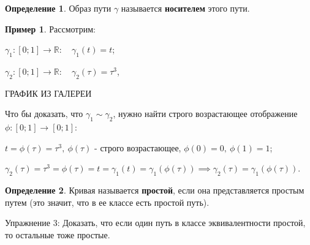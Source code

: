 \documentclass{report}
\theoremstyle{definition}
\newtheorem{definition}{Определение}[section]
\newtheorem{example}{Пример}
\begin{document}
\begin{definition}
  Образ пути $\gamma$ называется \textbf{носителем} этого пути.
\end{definition}

\begin{example}
  Рассмотрим:
  
  $\gamma_1: [0;1] \rightarrow \mathbb{R}: \quad \gamma_1(t) = t$;

  $\gamma_2: [0;1] \rightarrow \mathbb{R}: \quad \gamma_2(\tau) = \tau^3$,

  {\Large ГРАФИК ИЗ ГАЛЕРЕИ}

  Что бы доказать, что $\gamma_1 \sim \gamma_2$, нужно найти строго возрастающее отображение
  $\phi:[0;1]\rightarrow[0;1]$:

  $t = \phi(\tau) = \tau^3, \ \phi(\tau)$ - строго возрастающее, $\phi(0) = 0, \ \phi(1) = 1$;

  $\gamma_2(\tau) = \tau^3 = \phi(\tau) = t = \gamma_1(t) = \gamma_1(\phi(\tau)) \implies
  \gamma_2(\tau) = \gamma_1(\phi(\tau))$.
\end{example}

\begin{definition}
  Кривая называется \textbf{простой}, если она представляется простым путем (это значит, что в ее классе
  есть простой путь).
\end{definition}

Упражнение 3: Доказать, что если один путь в классе эквивалентности простой, то остальные тоже простые.
\end{document}
